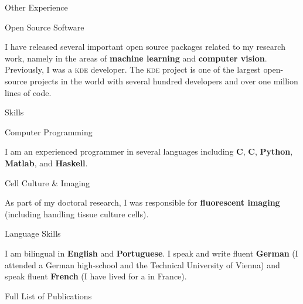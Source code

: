 \documentclass{article}
\renewcommand\section[1]{%
    \par\vspace{2em}%
    {\subhead #1}%
    \par\vspace{1em}%
}
\newcommand\cvitem[2][\relax]{%
    \par\vspace{.8em}
    \if\relax#1\else\textsc{#1}\hspace{1em}\fi%
    {\Textblack #2}%
    \par\vspace{.4em}
}
\begin{document}
\section{Other Experience}

\cvitem{Open Source Software}
I have released several important open source packages related to my research
work, namely in the areas of \textbf{machine learning} and \textbf{computer
vision}. Previously, I was a \textsc{kde} developer. The \textsc{kde} project
is one of the largest open-source projects in the world with several hundred
developers and over one million lines of code.

\section{Skills}

\cvitem{Computer Programming}
I am an experienced programmer in several languages including \textbf{C},
\textbf{C\raisebox{.1em}{\tiny \bf ++}}, \textbf{Python}, \textbf{Matlab}, and
\textbf{Haskell}.

\cvitem{Cell Culture \& Imaging}
As part of my doctoral research, I was responsible for \textbf{fluorescent
imaging} (including handling tissue culture cells).

\cvitem{Language Skills}
I am bilingual in \textbf{English} and \textbf{Portuguese}. I speak and write
fluent \textbf{German} (I attended a German high-school and the Technical
University of Vienna) and speak fluent \textbf{French} (I have lived for a in
France).

\vspace{4.1em}
\section{Full List of Publications}
\vspace{2em}
\end{document}
